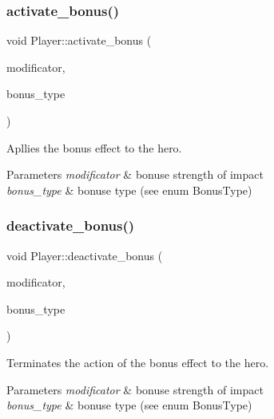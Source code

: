 \subsubsection{\texorpdfstring{activate\+\_\+bonus()}{activate\_bonus()}}
{\footnotesize\ttfamily void Player\+::activate\+\_\+bonus (\begin{DoxyParamCaption}\item[{double}]{modificator,  }\item[{Bonus\+Type}]{bonus\+\_\+type }\end{DoxyParamCaption})}



Apllies the bonus effect to the hero. 


\begin{DoxyParams}{Parameters}
{\em modificator} & bonuse strength of impact \\
\hline
{\em bonus\+\_\+type} & bonuse type (see enum Bonus\+Type) \\
\hline
\end{DoxyParams}
\mbox{\label{class_player_a984c3a87de751efe818203bb01e8d5e9}} 
\subsubsection{\texorpdfstring{deactivate\+\_\+bonus()}{deactivate\_bonus()}}
{\footnotesize\ttfamily void Player\+::deactivate\+\_\+bonus (\begin{DoxyParamCaption}\item[{double}]{modificator,  }\item[{Bonus\+Type}]{bonus\+\_\+type }\end{DoxyParamCaption})}



Terminates the action of the bonus effect to the hero. 


\begin{DoxyParams}{Parameters}
{\em modificator} & bonuse strength of impact \\
\hline
{\em bonus\+\_\+type} & bonuse type (see enum Bonus\+Type) \\
\hline
\end{DoxyParams}
\mbox{\label{class_player_ab62b84f866fb3075bfbf8ea455d73375}} 

